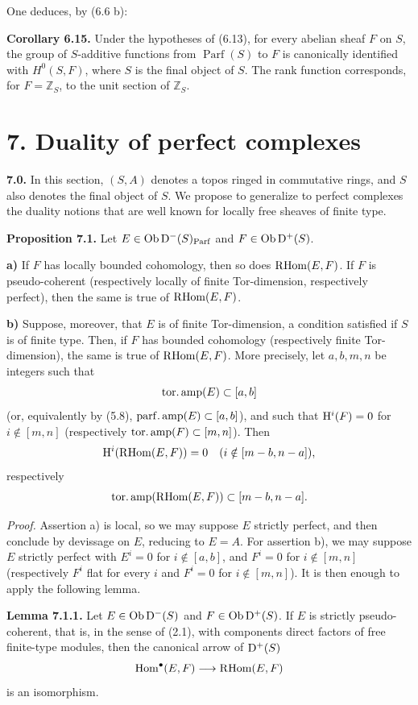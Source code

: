\documentclass[11pt]{article}
\newcommand{\Parf}{\operatorname{Parf}}
\begin{document}
One deduces, by (6.6 b):

\textbf{Corollary 6.15.} Under the hypotheses of (6.13), for every abelian sheaf \(F\) on \(S\), the group of \(S\)-additive functions from \(\Parf(S)\) to \(F\) is canonically identified with \(H^0(S,F)\), where \(S\) is the final object of \(S\). The rank function corresponds, for \(F=\mathbb Z_S\), to the unit section of \(\mathbb Z_S\).

\section*{7. Duality of perfect complexes}

\textbf{7.0.} In this section, \((S,A)\) denotes a topos ringed in commutative rings, and \(S\) also denotes the final object of \(S\). We propose to generalize to perfect complexes the duality notions that are well known for locally free sheaves of finite type.

\textbf{Proposition 7.1.} Let \(E\in\Ob\Dpx^-(S)_{\Parf}\) and \(F\in\operatorname{Ob}\mathrm D^+(S)\).

\textbf{a)} If \(F\) has locally bounded cohomology, then so does \(\mathrm R\!\operatorname{Hom}(E,F)\). If \(F\) is pseudo-coherent (respectively locally of finite Tor-dimension, respectively perfect), then the same is true of \(\mathrm R\!\operatorname{Hom}(E,F)\).

\textbf{b)} Suppose, moreover, that \(E\) is of finite Tor-dimension, a condition satisfied if \(S\) is of finite type. Then, if \(F\) has bounded cohomology (respectively finite Tor-dimension), the same is true of \(\mathrm R\!\operatorname{Hom}(E,F)\). More precisely, let \(a,b,m,n\) be integers such that
\[
  \operatorname{tor.amp}(E)\subset[a,b]
\]
(or, equivalently by (5.8), \(\operatorname{parf.amp}(E)\subset[a,b]\)), and such that \(\mathrm H^i(F)=0\) for \(i\notin[m,n]\) (respectively \(\operatorname{tor.amp}(F)\subset[m,n]\)). Then
\[
  \mathrm H^i(\mathrm R\!\operatorname{Hom}(E,F))=0\quad(i\notin[m-b,n-a]),
\]
respectively
\[
  \operatorname{tor.amp}(\mathrm R\!\operatorname{Hom}(E,F))\subset[m-b,n-a].
\]

\emph{Proof.} Assertion a) is local, so we may suppose \(E\) strictly perfect, and then conclude by devissage on \(E\), reducing to \(E=A\). For assertion b), we may suppose \(E\) strictly perfect with \(E^i=0\) for \(i\notin[a,b]\), and \(F^i=0\) for \(i\notin[m,n]\) (respectively \(F^i\) flat for every \(i\) and \(F^i=0\) for \(i\notin[m,n]\)). It is then enough to apply the following lemma.

\textbf{Lemma 7.1.1.} Let \(E\in\operatorname{Ob}\mathrm D^-(S)\) and \(F\in\operatorname{Ob}\mathrm D^+(S)\). If \(E\) is strictly pseudo-coherent, that is, in the sense of (2.1), with components direct factors of free finite-type modules, then the canonical arrow of \(\mathrm D^+(S)\)
\[
  \operatorname{Hom}^\bullet(E,F)\longrightarrow \mathrm R\!\operatorname{Hom}(E,F)
\]
is an isomorphism.
\end{document}
